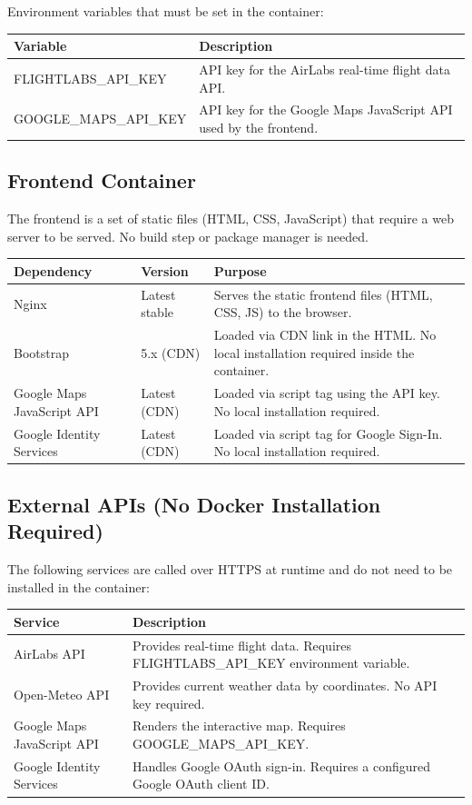 \documentclass[12pt]{article}
\begin{document}
Environment variables that must be set in the container:

\begin{tabular}{|l|p{9cm}|}
\hline
Variable & Description \\
\hline
FLIGHTLABS\_API\_KEY & API key for the AirLabs real-time flight data API. \\
\hline
GOOGLE\_MAPS\_API\_KEY & API key for the Google Maps JavaScript API used by the frontend. \\
\hline
\end{tabular}

\subsection{Frontend Container}

The frontend is a set of static files (HTML, CSS, JavaScript) that require a web server to be served. No build step or package manager is needed.

\begin{tabular}{|l|l|p{6cm}|}
\hline
Dependency & Version & Purpose \\
\hline
Nginx & Latest stable & Serves the static frontend files (HTML, CSS, JS) to the browser. \\
\hline
Bootstrap & 5.x (CDN) & Loaded via CDN link in the HTML. No local installation required inside the container. \\
\hline
Google Maps JavaScript API & Latest (CDN) & Loaded via script tag using the API key. No local installation required. \\
\hline
Google Identity Services & Latest (CDN) & Loaded via script tag for Google Sign-In. No local installation required. \\
\hline
\end{tabular}

\subsection{External APIs (No Docker Installation Required)}
The following services are called over HTTPS at runtime and do not need to be installed in the container:

\begin{tabular}{|l|p{10cm}|}
\hline
Service & Description \\
\hline
AirLabs API & Provides real-time flight data. Requires FLIGHTLABS\_API\_KEY environment variable. \\
\hline
Open-Meteo API & Provides current weather data by coordinates. No API key required. \\
\hline
Google Maps JavaScript API & Renders the interactive map. Requires GOOGLE\_MAPS\_API\_KEY. \\
\hline
Google Identity Services & Handles Google OAuth sign-in. Requires a configured Google OAuth client ID. \\
\hline
\end{tabular}
\end{document}
